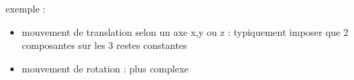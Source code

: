 \documentclass[12pt,a4paper]{article}
\begin{document}
exemple : 
\begin{itemize}
	\item mouvement de translation selon un axe x,y ou z : typiquement imposer que 2 composantes sur les 3 restes constantes
	\item mouvement de rotation : plus complexe
\end{itemize}



\newpage

\end{document}
